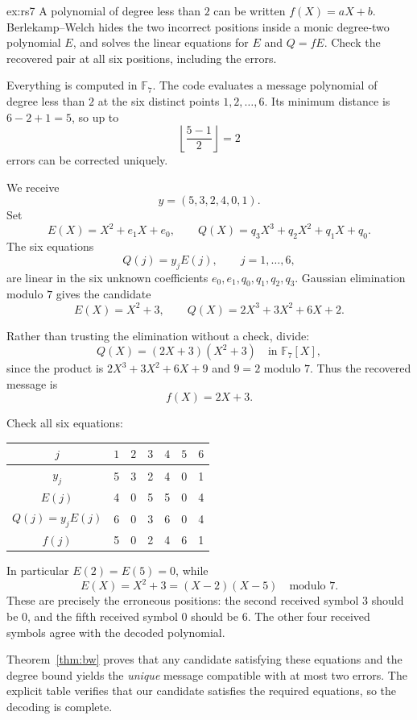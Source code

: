 \begin{solution}{ex:rs7}
\idea A polynomial of degree less than $2$ can be written $f(X)=aX+b$. Berlekamp--Welch hides the two incorrect positions inside a monic degree-two polynomial $E$, and solves the linear equations for $E$ and $Q=fE$. Check the recovered pair at all six positions, including the errors.

\writeup Everything is computed in $\mathbb F_7$. The code evaluates a message polynomial of degree less than $2$ at the six distinct points $1,2,\ldots,6$. Its minimum distance is $6-2+1=5$, so up to
\[
\left\lfloor\frac{5-1}{2}\right\rfloor=2
\]
errors can be corrected uniquely.

We receive
\[
y=(5,3,2,4,0,1).
\]
Set
\[
E(X)=X^2+e_1X+e_0,\qquad
Q(X)=q_3X^3+q_2X^2+q_1X+q_0.
\]
The six equations
\[
Q(j)=y_jE(j),\qquad j=1,\ldots,6,
\]
are linear in the six unknown coefficients $e_0,e_1,q_0,q_1,q_2,q_3$. Gaussian elimination modulo $7$ gives the candidate
\[
E(X)=X^2+3,\qquad
Q(X)=2X^3+3X^2+6X+2.
\]

Rather than trusting the elimination without a check, divide:
\[
Q(X)=(2X+3)(X^2+3)
\quad\text{in }\mathbb F_7[X],
\]
since the product is $2X^3+3X^2+6X+9$ and $9=2$ modulo $7$. Thus the recovered message is
\[
\boxed{f(X)=2X+3}.
\]

Check all six equations:
\begin{center}
\small
\begin{tabular}{c|rrrrrr}
$j$&$1$&$2$&$3$&$4$&$5$&$6$\\\hline
$y_j$&5&3&2&4&0&1\\
$E(j)$&4&0&5&5&0&4\\
$Q(j)=y_jE(j)$&6&0&3&6&0&4\\
$f(j)$&5&0&2&4&6&1
\end{tabular}
\end{center}
In particular $E(2)=E(5)=0$, while
\[
E(X)=X^2+3=(X-2)(X-5)
\quad\text{modulo }7.
\]
These are precisely the erroneous positions: the second received symbol $3$ should be $0$, and the fifth received symbol $0$ should be $6$. The other four received symbols agree with the decoded polynomial.

Theorem~\ref{thm:bw} proves that any candidate satisfying these equations and the degree bound yields the \emph{unique} message compatible with at most two errors. The explicit table verifies that our candidate satisfies the required equations, so the decoding is complete.
\end{solution}


